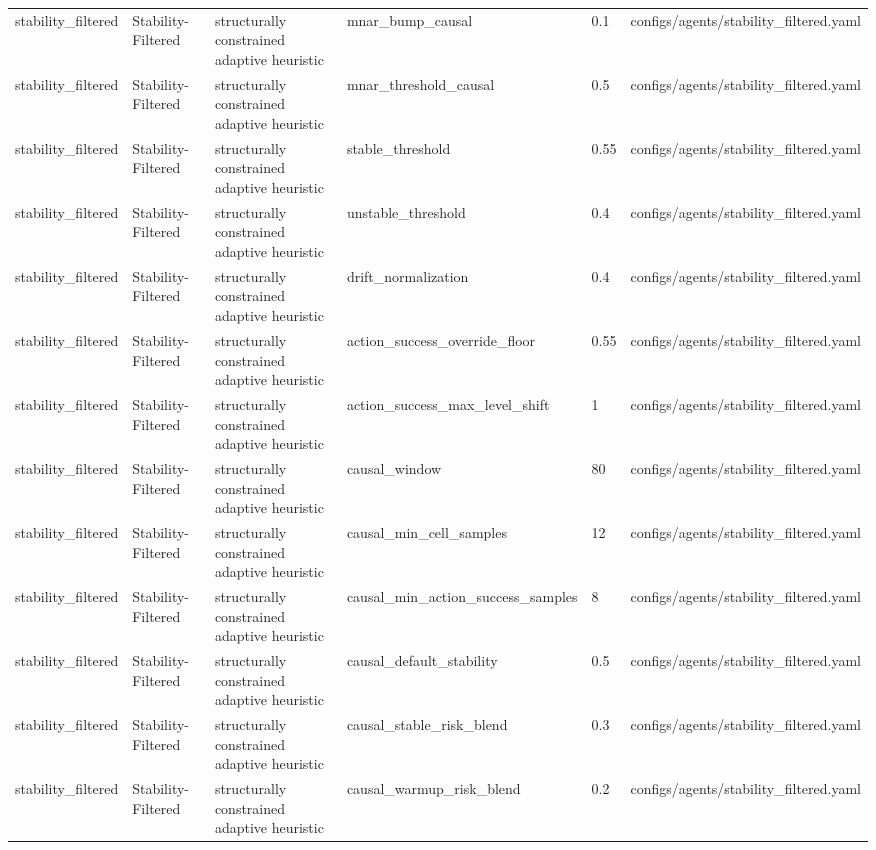 \begin{tabular}{llllll}
stability\_filtered & Stability-Filtered & structurally constrained adaptive heuristic & mnar\_bump\_causal & 0.1 & configs/agents/stability\_filtered.yaml \\
stability\_filtered & Stability-Filtered & structurally constrained adaptive heuristic & mnar\_threshold\_causal & 0.5 & configs/agents/stability\_filtered.yaml \\
stability\_filtered & Stability-Filtered & structurally constrained adaptive heuristic & stable\_threshold & 0.55 & configs/agents/stability\_filtered.yaml \\
stability\_filtered & Stability-Filtered & structurally constrained adaptive heuristic & unstable\_threshold & 0.4 & configs/agents/stability\_filtered.yaml \\
stability\_filtered & Stability-Filtered & structurally constrained adaptive heuristic & drift\_normalization & 0.4 & configs/agents/stability\_filtered.yaml \\
stability\_filtered & Stability-Filtered & structurally constrained adaptive heuristic & action\_success\_override\_floor & 0.55 & configs/agents/stability\_filtered.yaml \\
stability\_filtered & Stability-Filtered & structurally constrained adaptive heuristic & action\_success\_max\_level\_shift & 1 & configs/agents/stability\_filtered.yaml \\
stability\_filtered & Stability-Filtered & structurally constrained adaptive heuristic & causal\_window & 80 & configs/agents/stability\_filtered.yaml \\
stability\_filtered & Stability-Filtered & structurally constrained adaptive heuristic & causal\_min\_cell\_samples & 12 & configs/agents/stability\_filtered.yaml \\
stability\_filtered & Stability-Filtered & structurally constrained adaptive heuristic & causal\_min\_action\_success\_samples & 8 & configs/agents/stability\_filtered.yaml \\
stability\_filtered & Stability-Filtered & structurally constrained adaptive heuristic & causal\_default\_stability & 0.5 & configs/agents/stability\_filtered.yaml \\
stability\_filtered & Stability-Filtered & structurally constrained adaptive heuristic & causal\_stable\_risk\_blend & 0.3 & configs/agents/stability\_filtered.yaml \\
stability\_filtered & Stability-Filtered & structurally constrained adaptive heuristic & causal\_warmup\_risk\_blend & 0.2 & configs/agents/stability\_filtered.yaml \\

\end{tabular}
